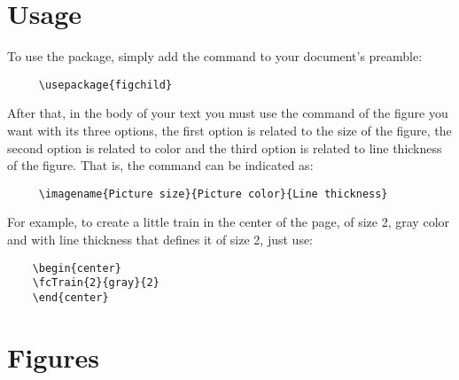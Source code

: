 \documentclass[x11names]{article}
\begin{document}

\section{Usage}

\hspace{\parindent}To use the package, simply add the command to your document's preamble:

\begin{verbatim}
     \usepackage{figchild}
\end{verbatim}

After that, in the body of your text you must use the command of the figure you want with its three options, the first option is related to the size of the figure, the second option is related to color and the third option is related to line thickness of the figure. That is, the command can be indicated as:

\begin{verbatim}
     \imagename{Picture size}{Picture color}{Line thickness}
\end{verbatim}

For example, to create a little train in the center of the page, of size 2, gray color and with line thickness that defines it of size 2, just use:

\begin{verbatim}
    \begin{center}
    \fcTrain{2}{gray}{2}
    \end{center}
\end{verbatim}

\begin{center}
\end{center}




\section{Figures}
\end{document}
